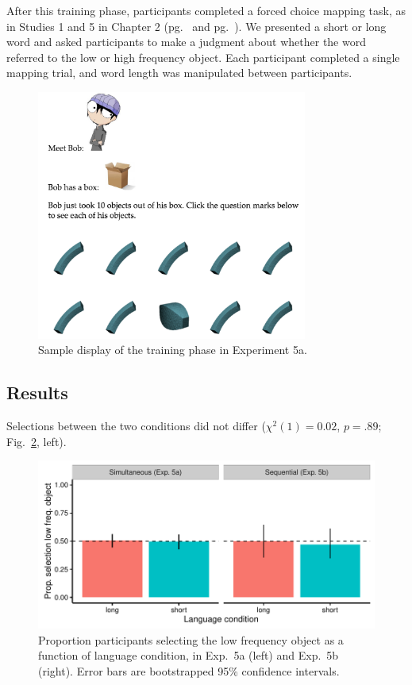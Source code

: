 After this training phase, participants completed a forced choice mapping task, as in Studies 1 and 5 in Chapter 2 (pg.\ \pageref{ch2-1} and pg.\ \pageref{ch2-5}). We presented a short or long word and asked participants to make a judgment about whether the word referred to the low or high frequency object. Each participant completed a single mapping trial, and word length was manipulated between participants.

 \begin{figure}
 \begin{center}
  \includegraphics[width=3.5in]{figs/seqfreq_display.png}
  \caption{\label{fig:seqfreq_display} Sample display of the training phase in Experiment 5a.}
 \end{center}
\end{figure}


 \subsection{Results}
 Selections between the two conditions did not differ (${\chi}^2$$(1) = 0.02$, $p = .89$; Fig.\ \ref{fig:freq_plots}, left).
 
  \begin{figure}
 \begin{center}
  \includegraphics[width=6in]{figs/freq_plots.pdf}
  \caption{\label{fig:freq_plots} Proportion participants selecting the low frequency object as a function of language condition, in Exp.\ 5a (left) and Exp.\ 5b (right). Error bars are bootstrapped 95\% confidence intervals.}
 \end{center}
\end{figure}



